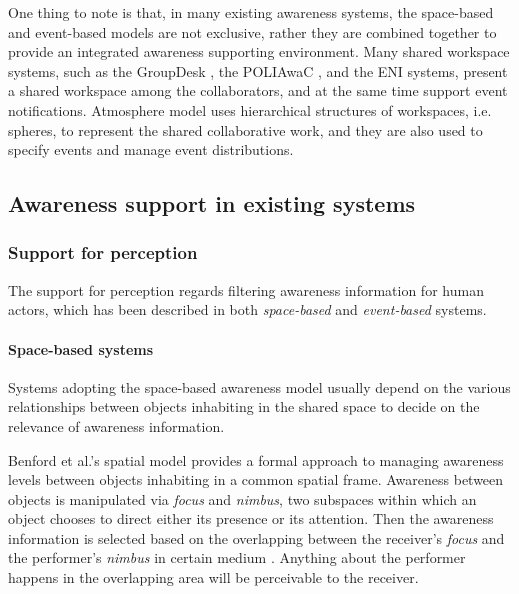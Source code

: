 One thing to note is that, in many existing awareness systems, the space-based and event-based models are not exclusive, rather they are combined together to provide an integrated awareness supporting environment. Many shared workspace systems, such as the GroupDesk \cite{Fuchs1995}, the POLIAwaC \cite{sohlenkamp2000po}, and the ENI \cite{Gross2004} systems, present a shared workspace among the collaborators, and at the same time support event notifications. Atmosphere model \cite{Rittenbruch2002} uses hierarchical structures of workspaces, i.e. spheres, to represent the shared collaborative work, and they are also used to specify events and manage event distributions.

\subsection{Awareness support in existing systems} %
\label{sub:awareness_support_in_existing_systems}

\subsubsection{Support for perception} %
\label{ssub:support_for_perception}
The support for perception regards filtering awareness information for human actors, which has been described in both \emph{space-based} and \emph{event-based} systems.

\paragraph*{Space-based systems} %
\label{par:space_based_systems}
Systems adopting the space-based awareness model usually depend on the various relationships between objects inhabiting in the shared space to decide on the relevance of awareness information.

Benford et al.'s spatial model \cite{Benford1993} provides a formal approach to managing awareness levels between objects inhabiting in a common spatial frame. Awareness between objects is manipulated via \emph{focus} and \emph{nimbus}, two subspaces within which an object chooses to direct either its presence or its attention. Then the awareness information is selected based on the overlapping between the receiver's \emph{focus} and the performer's \emph{nimbus} in certain medium \cite{Benford1993}. Anything about the performer happens in the overlapping area will be perceivable to the receiver. 

